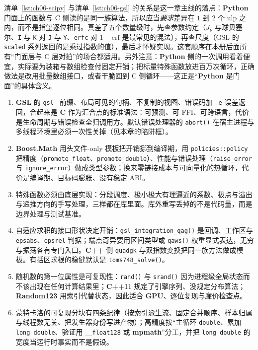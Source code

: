 \documentclass[12pt,a4paper,fontset=fandol]{ctexbook}
\newcommand{\Fn}[1]{\texttt{#1()}}
\newcommand{\Tp}[1]{\texttt{#1}}
\newcommand{\Bk}{\allowbreak}
\newcommand{\Lib}[1]{\textbf{#1}}
\newcommand{\Lang}[1]{\textsf{\bfseries #1}}
\newcommand{\CL}{\Lang{C}}
\newcommand{\CPP}{\Lang{C++}}
\newcommand{\PY}{\Lang{Python}}
\begin{document}
\begin{note}[title={门面与 C 侧对拍的判据}]
清单~\ref{lst:ch06-scipy} 与清单~\ref{lst:ch06-gsl} 的关系是这一章主线的落点：\PY{} 门面上的函数与 C 侧读的是同一族算法，所以应当\emph{要求}差异在 $1$ 到 $2$ 个 ulp 之内，而不是指望逐位相同。真差了五个数量级时，先查参数约定（$J_\nu$ 与球贝塞尔、\Tp{I} 与 \Tp{K} 对 \Tp{J} 与 \Tp{Y}、\Tp{erfc} 对 $1-\mathrm{erf}$ 是最常见的混法），再查尺度（GSL 的 \Tp{scaled} 系列返回的是乘过指数的值），最后才怀疑实现。这套顺序在本册后面所有``门面层与 C 层对拍''的场合都适用。另外注意：\PY{} 侧的一次调用看着便宜，实际要为装箱与数组检查付固定开销；把标量特殊函数放进百万次循环，正确做法是改用批量数组接口，或者干脆回到 C 侧循环——这正是``\PY{} 是门面''的具体含义。
\end{note}

\begin{guideline}[title={本章要点}]
\begin{enumerate}
\item \Lib{GSL} 的 \Tp{gsl\_} 前缀、布局可见的句柄、不复制的视图、错误码加 \Tp{\_e} 误差返回，合起来是 \CL{} 作为汇合点的标准语法：可预测、可 FFI、可跨语言，代价是生命周期与错误检查全归调用方。默认错误处理器的 \Fn{abort} 在宿主进程与多线程环境里必须一次性关掉（见本章的陷阱框）。
\item \Lib{Boost.Math} 用头文件-only 模板把开销挪到编译期，用 \Tp{policies::policy} 把精度（\Tp{promote\_float}、\Tp{promote\_double}）、性能与错误处理（\Tp{raise\_error} 与 \Tp{ignore\_error}）做成类型参数；换来零链接成本与可向量化的热循环，代价是编译期、目标码膨胀、没有稳定 ABI。
\item 特殊函数必须由底层实现：分段调度、极小极大有理逼近的系数、极点与溢出与递推方向的手写处理，三样都在库里面。库外重写丢掉的不是代码量，而是边界处理与测试基准。
\item 自适应求积的接口形状决定开销：\Fn{gsl\_integration\Bk\_qag} 是回调、工作区与 \Tp{epsabs}、\Tp{epsrel} 判据；端点奇异要用区间类型或 \Fn{qaws} 权重显式表达，无穷与振荡各有专门入口。\CPP{} 侧 \Tp{quadgk} 与双指数变换把同一族方法做成模板。有括区求根的稳健默认是 \Fn{toms748\_solve}。
\item 随机数的第一位属性是可复现性：\Tp{rand()} 与 \Tp{srand()} 因为进程级全局状态而不该出现在任何计算结果里；\CPP{}11 规定了引擎序列、没规定分布算法；\Lib{Random123} 用索引代替状态，因此适合 \Lang{GPU}、逐位复现与廉价检查点。
\item 蒙特卡洛的可复现分块有四条纪律（按索引派生流、固定合并顺序、样本归属与线程数无关、把发生器身份写进产物）；高精度按``主循环 \Tp{double}、累加 \Tp{long double}、验证用 \Tp{\_\_float128} 或 \Lib{mpmath}''分工，并把 \Tp{long double} 的宽度当运行时事实而不是假设。
\end{enumerate}
\end{guideline}
\end{document}
